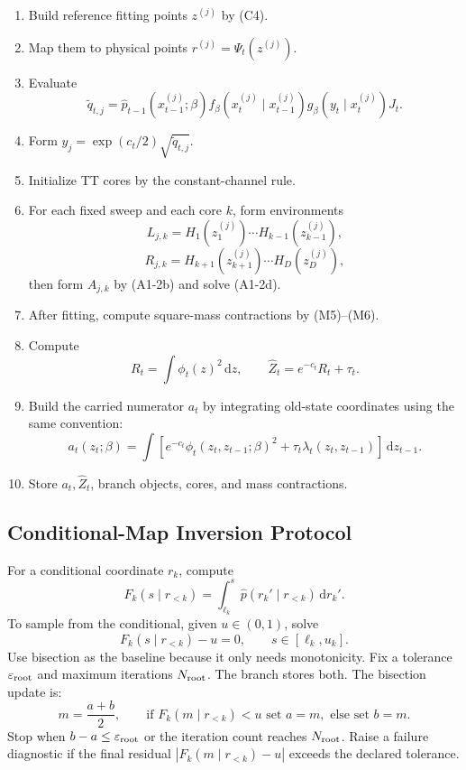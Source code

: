 \documentclass[11pt]{article}
\newcommand{\dd}{\,\mathrm d}
\begin{document}
\begin{enumerate}[leftmargin=2em]
\item Build reference fitting points \(z^{(j)}\) by (C4).
\item Map them to physical points \(r^{(j)}=\Psi_t(z^{(j)})\).
\item Evaluate
\[
    \widetilde q_{t,j}
    =
    \widehat p_{t-1}(x_{t-1}^{(j)};\beta)
    f_\beta(x_t^{(j)}\mid x_{t-1}^{(j)})
    g_\beta(y_t\mid x_t^{(j)})J_t.
\]
\item Form \(y_j=\exp(c_t/2)\sqrt{\widetilde q_{t,j}}\).
\item Initialize TT cores by the constant-channel rule.
\item For each fixed sweep and each core \(k\), form environments
\[
    L_{j,k}=H_1(z_1^{(j)})\cdots H_{k-1}(z_{k-1}^{(j)}),
\]
\[
    R_{j,k}=H_{k+1}(z_{k+1}^{(j)})\cdots H_D(z_D^{(j)}),
\]
then form \(A_{j,k}\) by (A1-2b) and solve (A1-2d).
\item After fitting, compute square-mass contractions by (M5)--(M6).
\item Compute
\[
    R_t=\int\phi_t(z)^2\dd z,\qquad
    \widehat Z_t=e^{-c_t}R_t+\tau_t.
\]
\item Build the carried numerator \(a_t\) by integrating old-state coordinates
using the same convention:
\[
    a_t(z_t;\beta)
    =
    \int
    \left[e^{-c_t}\phi_t(z_t,z_{t-1};\beta)^2
    +\tau_t\lambda_t(z_t,z_{t-1})\right]\dd z_{t-1}.
\]
\item Store \(a_t,\widehat Z_t\), branch objects, cores, and mass contractions.
\end{enumerate}

\subsection{Conditional-Map Inversion Protocol}

For a conditional coordinate \(r_k\), compute
\[
    F_k(s\mid r_{<k})
    =
    \int_{\ell_k}^{s}\widehat p(r_k'\mid r_{<k})\dd r_k'.
\]
To sample from the conditional, given \(u\in(0,1)\), solve
\[
    F_k(s\mid r_{<k})-u=0,\qquad s\in[\ell_k,u_k].
\]
Use bisection as the baseline because it only needs monotonicity.  Fix a
tolerance \(\varepsilon_{\rm root}\) and maximum iterations \(N_{\rm root}\).
The branch stores both.  The bisection update is:
\[
    m=\frac{a+b}{2},\qquad
    \text{if }F_k(m\mid r_{<k})<u\text{ set }a=m,\text{ else set }b=m.
\]
Stop when \(b-a\le\varepsilon_{\rm root}\) or the iteration count reaches
\(N_{\rm root}\).  Raise a failure diagnostic if the final residual
\(|F_k(m\mid r_{<k})-u|\) exceeds the declared tolerance.
\end{document}
